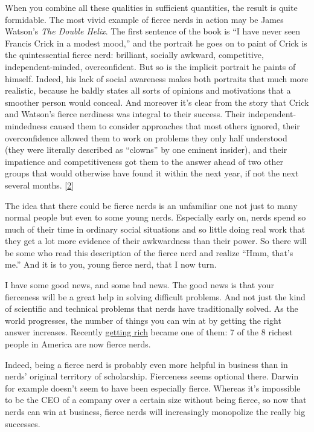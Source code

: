 When you combine all these qualities in sufficient quantities, the
result is quite formidable. The most vivid example of fierce nerds in
action may be James Watson's \emph{The Double Helix}. The first sentence
of the book is ``I have never seen Francis Crick in a modest mood,'' and
the portrait he goes on to paint of Crick is the quintessential fierce
nerd: brilliant, socially awkward, competitive, independent-minded,
overconfident. But so is the implicit portrait he paints of himself.
Indeed, his lack of social awareness makes both portraits that much more
realistic, because he baldly states all sorts of opinions and
motivations that a smoother person would conceal. And moreover it's
clear from the story that Crick and Watson's fierce nerdiness was
integral to their success. Their independent-mindedness caused them to
consider approaches that most others ignored, their overconfidence
allowed them to work on problems they only half understood (they were
literally described as ``clowns'' by one eminent insider), and their
impatience and competitiveness got them to the answer ahead of two other
groups that would otherwise have found it within the next year, if not
the next several months. {[}\hyperref[f2n]{2}{]}

The idea that there could be fierce nerds is an unfamiliar one not just
to many normal people but even to some young nerds. Especially early on,
nerds spend so much of their time in ordinary social situations and so
little doing real work that they get a lot more evidence of their
awkwardness than their power. So there will be some who read this
description of the fierce nerd and realize ``Hmm, that's me.'' And it is
to you, young fierce nerd, that I now turn.

I have some good news, and some bad news. The good news is that your
fierceness will be a great help in solving difficult problems. And not
just the kind of scientific and technical problems that nerds have
traditionally solved. As the world progresses, the number of things you
can win at by getting the right answer increases. Recently
\href{richnow.html}{getting rich} became one of them: 7 of the 8 richest
people in America are now fierce nerds.

Indeed, being a fierce nerd is probably even more helpful in business
than in nerds' original territory of scholarship. Fierceness seems
optional there. Darwin for example doesn't seem to have been especially
fierce. Whereas it's impossible to be the CEO of a company over a
certain size without being fierce, so now that nerds can win at
business, fierce nerds will increasingly monopolize the really big
successes.

